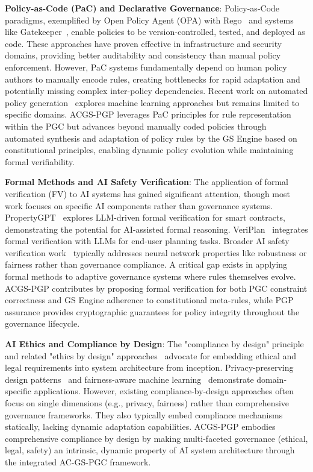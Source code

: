 \documentclass[sigconf,review,anonymous=false]{acmart} %
\begin{document}
\textbf{Policy-as-Code (PaC) and Declarative Governance}: Policy-as-Code paradigms, exemplified by Open Policy Agent (OPA) with Rego~\cite{OpenPolicyAgentOPAGraduation} and systems like Gatekeeper~\cite{KubernetesGatekeeper}, enable policies to be version-controlled, tested, and deployed as code. These approaches have proven effective in infrastructure and security domains, providing better auditability and consistency than manual policy enforcement. However, PaC systems fundamentally depend on human policy authors to manually encode rules, creating bottlenecks for rapid adaptation and potentially missing complex inter-policy dependencies. Recent work on automated policy generation~\cite{ZhangAutomatedPolicyGeneration24} explores machine learning approaches but remains limited to specific domains. ACGS-PGP leverages PaC principles for rule representation within the PGC but advances beyond manually coded policies through automated synthesis and adaptation of policy rules by the GS Engine based on constitutional principles, enabling dynamic policy evolution while maintaining formal verifiability.

\textbf{Formal Methods and AI Safety Verification}: The application of formal verification (FV) to AI systems has gained significant attention, though most work focuses on specific AI components rather than governance systems. PropertyGPT~\cite{LiuPropertyGPT25} explores LLM-driven formal verification for smart contracts, demonstrating the potential for AI-assisted formal reasoning. VeriPlan~\cite{ChakrabortiVeriPlan25} integrates formal verification with LLMs for end-user planning tasks. Broader AI safety verification work~\cite{KatzCertifiedReliability17, WangFormalVerificationNeural21} typically addresses neural network properties like robustness or fairness rather than governance compliance. A critical gap exists in applying formal methods to adaptive governance systems where rules themselves evolve. ACGS-PGP contributes by proposing formal verification for both PGC constraint correctness and GS Engine adherence to constitutional meta-rules, while PGP assurance provides cryptographic guarantees for policy integrity throughout the governance lifecycle.

\textbf{AI Ethics and Compliance by Design}: The "compliance by design" principle~\cite{MartinezComplianceByDesign19} and related "ethics by design" approaches~\cite{DiggsFairnessPrivacyByDesign19} advocate for embedding ethical and legal requirements into system architecture from inception. Privacy-preserving design patterns~\cite{HoepmanPrivacyDesignStrategies14} and fairness-aware machine learning~\cite{BarocasCalibrationFairnessML19} demonstrate domain-specific applications. However, existing compliance-by-design approaches often focus on single dimensions (e.g., privacy, fairness) rather than comprehensive governance frameworks. They also typically embed compliance mechanisms statically, lacking dynamic adaptation capabilities. ACGS-PGP embodies comprehensive compliance by design by making multi-faceted governance (ethical, legal, safety) an intrinsic, dynamic property of AI system architecture through the integrated AC-GS-PGC framework.
\end{document}

